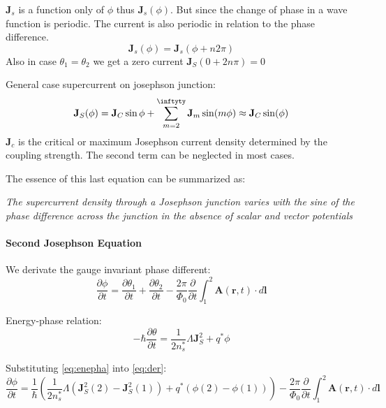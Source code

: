 \documentclass[12pt]{article}
\numberwithin{equation}{subsection}
\newcommand\page[1]{
{
}
}
\begin{document}
$\mathbf J_s$ is a function only of $\phi$ thus $\mathbf J_s(\phi)$. But since the change of phase in a wave function is periodic. The current is also periodic in relation to the phase difference.
\begin{equation}
    \mathbf J_s(\phi) = \mathbf J_s(\phi+n2\pi)
\end{equation}
Also in case $\theta_1=\theta_2$ we get a zero current $\mathbf J_S (0+2n\pi)=0$
\page{35}

General case supercurrent on josephson junction:
\begin{equation}
    \mathbf J_S (\phi) = \mathbf J_C \sin \phi + \sum^{\inftyty}_{m=2} \mathbf J_m \sin(m\phi) \approx \mathbf J_C \sin (\phi)
    \label{eq:currphase}
\end{equation}
$\mathbf J_c$ is the critical or maximum Josephson current density determined by the coupling strength. The second term can be neglected in most cases.

The essence of this last equation can be summarized as:

\emph{The supercurrent density through a Josephson junction varies with the sine of the phase difference across the junction in the absence of scalar and vector potentials}
\page{36}

\paragraph{Second Josephson Equation\\}

We derivate the gauge invariant phase different:
\begin{equation}
    \frac{\partial \phi}{\partial t} = \frac{\partial \theta_1}{\partial t}+\frac{\partial \theta_2}{\partial t} - \frac{2\pi}{\Phi_0}\frac{\partial}{\partial t} \int_1^2 \mathbf A(\mathbf r, t) \cdot d \mathbf l
    \label{eq:der}
\end{equation}

Energy-phase relation:
\begin{equation}
    -\hbar \frac{\partial \theta}{\partial t} = \frac{1}{2n^*_s} \Lambda \mathbf J^2_S +q^*\phi
    \label{eq:enepha}
\end{equation}

Substituting \ref{eq:enepha} into \ref{eq:der}:
\begin{equation}
    \frac{\partial \phi}{\partial t} = \frac{1}{\hbar} \left( \frac{1}{2n^*_s} \Lambda  (\mathbf J^2_S(2)- \mathbf J^2_S(1)) +q^*(\phi(2)-\phi(1)) \right)- \frac{2\pi}{\Phi_0}\frac{\partial}{\partial t} \int_1^2 \mathbf A(\mathbf r, t) \cdot d \mathbf l
    \label{eq:der}
\end{equation}
\end{document}
